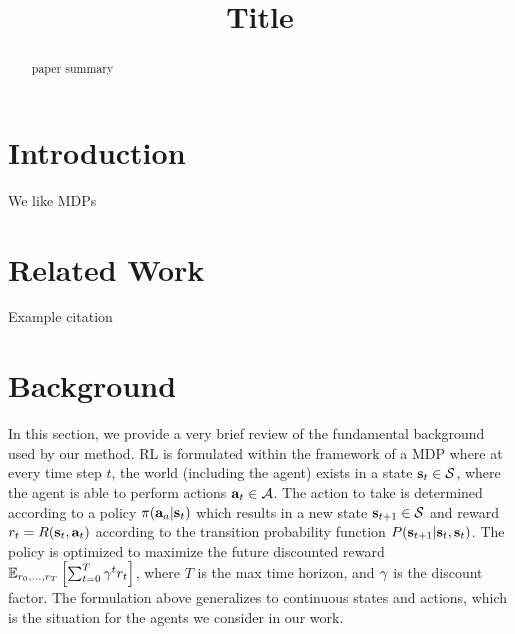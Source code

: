 \documentclass{article}
\title{Title}
\author{ 
  }
\begin{document}
%
\maketitle

\setlength\abovecaptionskip{0.1cm}



\begin{abstract}
paper summary
\end{abstract}

\section{Introduction}
\label{sec:intro}

We like \ac{MDP}s


\section{Related Work}
\label{sec:intro}

Example citation
\citep{mpo}

\section{Background}
\label{sec:background}

In this section, we provide a very brief review of the fundamental background used by our method. \ac{RL} is formulated within the framework of a \ac{MDP} where at every time step $t$, the world (including the agent) exists in a state $ \mathbf{s}_{t} 
\in \mathcal{S} $, where the agent is able to perform actions $ \mathbf{a}_{t} \in 
\mathcal{A} $. The action to take is determined according to a policy $ \pi(\mathbf{a}_{a}|\mathbf{s}_{t})$ which
results in a new state $ \mathbf{s}_{t+1} \in \mathcal{S} $  and reward $r_{t} = R(\mathbf{s}_t, \mathbf{a}_t)$ according to the transition 
probability function $ P(\mathbf{s}_{t+1} | \mathbf{s}_{t}, \mathbf{s}_{t}) $. 
The policy is optimized to maximize the future discounted reward
%
$
  \mathbb{E}_{r_{0}, ..., r_T} \left[ \sum_{t=0}^{T} \gamma^t r_{t} \right]$,
\noindent where $ T $ is the max time horizon, and $ \gamma $ is the 
discount factor.
The formulation above generalizes to continuous states and actions, which is the situation for the agents we consider in our work.
\end{document}
